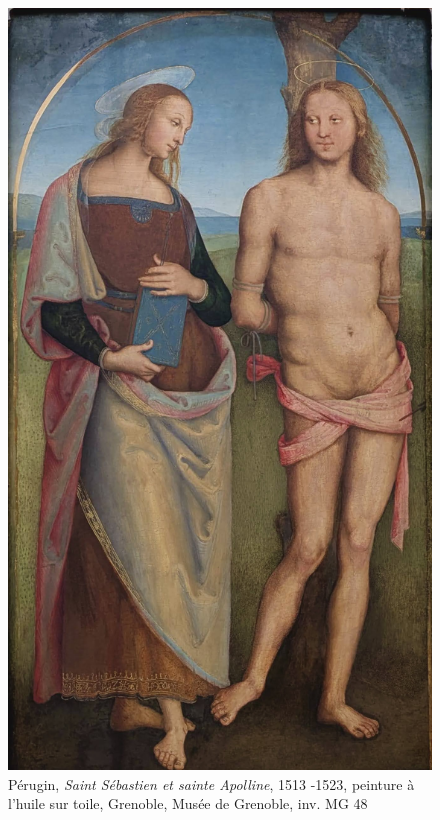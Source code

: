 \begin{figure}[H]
    \centering
    \includegraphics[height=0.4\textheight]{annexes/figures/ptrPeruginSaints.jpg}
    \caption{Pérugin, \textit{Saint Sébastien et sainte Apolline}, 1513 -1523, peinture à l'huile sur toile, Grenoble, Musée de Grenoble, inv. MG 48}
    \label{fig:ptrPeruginSaints}
\end{figure}

